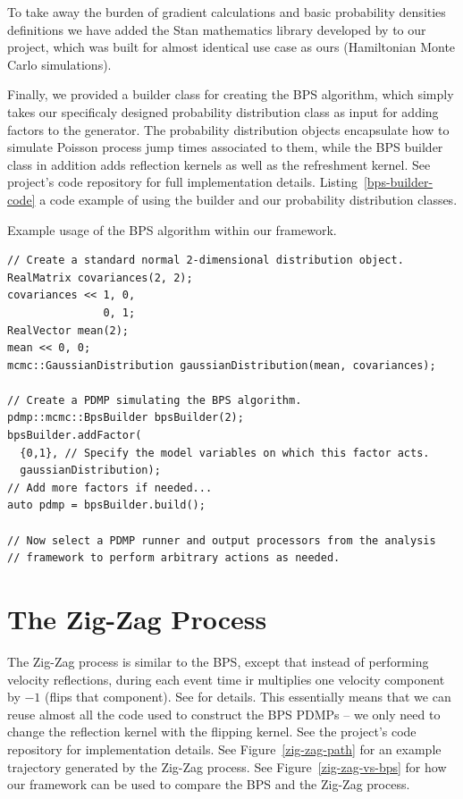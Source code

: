 \documentclass[report.tex]{subfiles}
\begin{document}
To take away the burden of gradient calculations and basic probability densities definitions
we have added the Stan mathematics library developed by \citet{carpenter2015stan} to our project, which was
built for almost identical use case as ours (Hamiltonian Monte Carlo simulations).

Finally, we provided a builder class for creating the BPS algorithm, which simply takes
our specificaly designed probability distribution class as input for adding factors to the generator.
The probability distribution objects encapsulate how to simulate Poisson process jump times
associated to them, while the BPS builder class in addition adds reflection kernels as well
as the refreshment kernel.
See project's code repository for full implementation details.
Listing~\ref{bps-builder-code} a code example of using the builder and our probability
distribution classes.

\begin{lstfloat}
\caption{Example usage of the BPS algorithm within our framework.}
\label{bps-builder-code}
\begin{lstlisting}
// Create a standard normal 2-dimensional distribution object.
RealMatrix covariances(2, 2);
covariances << 1, 0,
               0, 1;
RealVector mean(2);
mean << 0, 0;
mcmc::GaussianDistribution gaussianDistribution(mean, covariances);

// Create a PDMP simulating the BPS algorithm.
pdmp::mcmc::BpsBuilder bpsBuilder(2);
bpsBuilder.addFactor(
  {0,1}, // Specify the model variables on which this factor acts.
  gaussianDistribution);
// Add more factors if needed...
auto pdmp = bpsBuilder.build();

// Now select a PDMP runner and output processors from the analysis
// framework to perform arbitrary actions as needed.
\end{lstlisting}
\end{lstfloat}

\section{The Zig-Zag Process}

The Zig-Zag process is similar to the BPS, except that instead of performing
velocity reflections, during each event time ir multiplies one velocity component
by $-1$ (flips that component). See \citet{bierkens2016zig} for details.
This essentially means that we can reuse almost all the code used to construct
the BPS PDMPs -- we only need to change the reflection kernel with the flipping
kernel. See the project's code repository for implementation details.
See Figure~\ref{zig-zag-path} for an example trajectory generated by the Zig-Zag process.
See Figure~\ref{zig-zag-vs-bps} for how our framework can be used to compare the BPS and
the Zig-Zag process.
\end{document}
